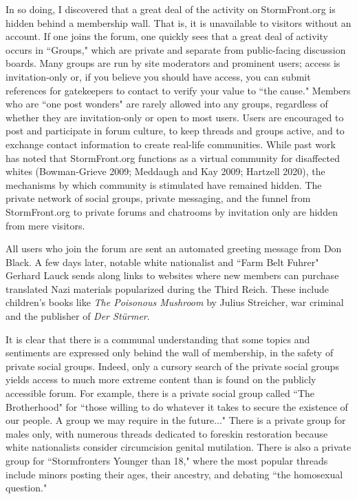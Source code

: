 \documentclass[12pt]{paper}
\begin{document}
In so doing, I discovered that a great deal of the activity on StormFront.org is hidden behind a membership wall. That is, it is unavailable to visitors without an account. If one joins the forum, one quickly sees that a great deal of activity occurs in ``Groups," which are private and separate from public-facing discussion boards. Many groups are run by site moderators and prominent users; access is invitation-only or, if you believe you should have access, you can submit references for gatekeepers to contact to verify your value to ``the cause." Members who are ``one post wonders" are rarely allowed into any groups, regardless of whether they are invitation-only or open to most users. Users are encouraged to post and participate in forum culture, to keep threads and groups active, and to exchange contact information to create real-life communities. While past work has noted that StormFront.org functions as a virtual community for disaffected whites (Bowman-Grieve 2009; Meddaugh and Kay 2009; Hartzell 2020), the mechanisms by which community is stimulated have remained hidden. The private network of social groups, private messaging, and the funnel from StormFront.org to private forums and chatrooms by invitation only are hidden from mere visitors.

All users who join the forum are sent an automated greeting message from Don Black. A few days later, notable white nationalist and ``Farm Belt Fuhrer" Gerhard Lauck sends along links to websites where new members can purchase translated Nazi materials popularized during the Third Reich. These include children's books like \textit{The Poisonous Mushroom} by Julius Streicher, war criminal and the publisher of \textit{Der Stürmer}.

It is clear that there is a communal understanding that some topics and sentiments are expressed only behind the wall of membership, in the safety of private social groups. Indeed, only a cursory search of the private social groups yields access to much more extreme content than is found on the publicly accessible forum. For example, there is a private social group called ``The Brotherhood" for ``those willing to do whatever it takes to secure the existence of our people. A group we may require in the future..." There is a private group for males only, with numerous threads dedicated to foreskin restoration because white nationalists consider circumcision genital mutilation. There is also a private group for ``Stormfronters Younger than 18," where the most popular threads include minors posting their ages, their ancestry, and debating ``the homosexual question."
\end{document}
